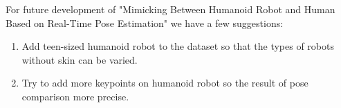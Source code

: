 For future development of "Mimicking Between Humanoid Robot and Human Based on Real-Time Pose Estimation" we have a few suggestions:

\begin{enumerate}[nolistsep]

  \item Add teen-sized humanoid robot to the dataset so that the types of robots without skin can be varied.
  \item Try to add more keypoints on humanoid robot so the result of pose comparison more precise.

\end{enumerate}
